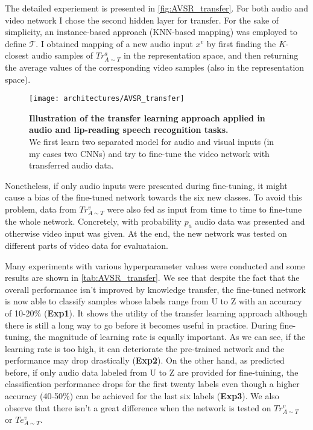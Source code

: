 The detailed experiement is presented in \autoref{fig:AVSR_transfer}.
For both audio and video network I chose the second hidden layer for
transfer. For the sake of simplicity, an instance-based approach
(KNN-based mapping) was employed to define $\mathcal{T}$.
I obtained mapping of a new audio
input $x^v$ by first finding the $K$-closest audio samples of
$Tr_{A\sim T}^a$ in the representation space, and then returning the
average values of the corresponding video samples
(also in the representation space).

\begin{figure}[H]
  \centering
  \texttt{[image: architectures/AVSR\_transfer]}
  \caption{%
    \textbf{Illustration of the transfer learning approach applied in
      audio and lip-reading speech recognition tasks.}\\[0.1em]
    We first learn two separated model for audio and visual inputs
      (in my cases two CNNs) and try to fine-tune the video network
      with transferred audio data.
    }
  \label{fig:AVSR_transfer}
\end{figure}

Nonetheless, if only audio inputs were presented during fine-tuning, it
might cause a bias of the fine-tuned network towards the six new classes.
To avoid this problem, data from $Tr_{A\sim T}^v$ were also fed as input
from time to time to fine-tune the whole network. Concretely, with
probability $p_a$ audio data was presented and otherwise video input
was given. At the end, the new network was tested on different parts of
video data for evaluataion.

Many experiments with various hyperparameter values were conducted
and some results are shown in \autoref{tab:AVSR_transfer}.
We see that despite the fact that the overall performance isn't improved
by knowledge transfer, the fine-tuned network is now able to classify
samples whose labels range from U to Z with an accuracy of 10-20\%
(\textbf{Exp1}). It shows the utility of the transfer learning approach
although there is still a long way to go before it becomes
useful in practice.
During fine-tuning, the magnitude of learning rate is equally important.
As we can see, if the learning rate is too high, it can deteriorate
the pre-trained network and the performance may drop drastically
(\textbf{Exp2}).
On the other hand, as predicted before, if only audio data labeled from
U to Z are provided for fine-tuining, the classification performance
drops for the first twenty labels even though a higher accuracy (40-50\%)
can be achieved for the last six labels (\textbf{Exp3}).
We also observe that there isn't a great difference when the network is
tested on $Tr_{A\sim T}^v$ or $Te_{A\sim T}^v$.

